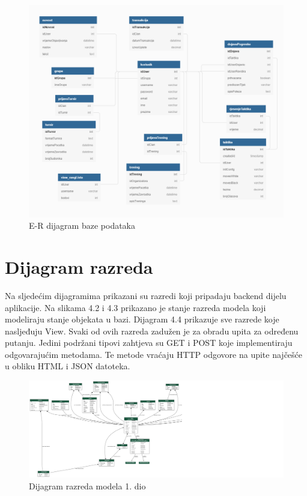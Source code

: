 			\begin{figure}[H]
					\centerfloat
        					\includegraphics[scale=0.60]{dijagrami/dijagramBaze.png} %
        					\caption{E-R dijagram baze podataka}
        					\label{fig:DBdiagram}
				\end{figure}
			
			\eject
			
			
		\section{Dijagram razreda}
		
		Na sljedećim dijagramima prikazani su razredi koji pripadaju backend dijelu aplikacije. 
		Na slikama 4.2 i 4.3 prikazano je stanje razreda modela koji modeliraju stanje objekata u bazi.
		Dijagram 4.4 prikazuje sve razrede koje nasljeđuju View. Svaki od ovih razreda zadužen je 
		za obradu upita za određenu putanju. Jedini podržani tipovi zahtjeva su GET i POST koje
		implementiraju odgovarajućim metodama. Te metode vraćaju HTTP odgovore na upite 
		najčešće u obliku HTML i JSON datoteka.

\eject

			\begin{figure}[H]
					\centerfloat
					\advance{}
        					\includegraphics[scale=0.26]{dijagrami/final_models1.png} %
        					\caption{Dijagram razreda modela 1. dio}
        					\label{fig:DijagramRazredaModel}
			\end{figure}
			\eject
			
